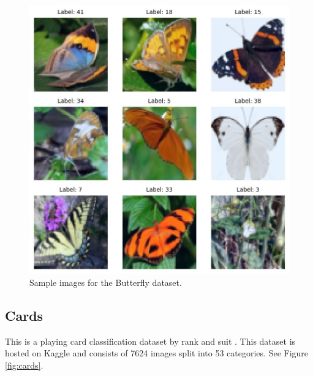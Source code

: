 \documentclass[letterpaper]{article} %
\theoremstyle{plain}
\theoremstyle{definition}
\theoremstyle{remark}
\begin{document}
\begin{figure}[htbp]
    \centering
    \includegraphics[width=\columnwidth]{../../images/butterfly_1_sample.jpg}
    \caption{Sample images for the Butterfly dataset.}
    \label{fig:butterfly}
\end{figure}

\subsection{Cards} This is a playing card classification dataset by rank and suit \citep{card_data}. This dataset is hosted on Kaggle and consists of 7624 images split into 53 categories. See Figure \ref{fig:cards}.
\end{document}
